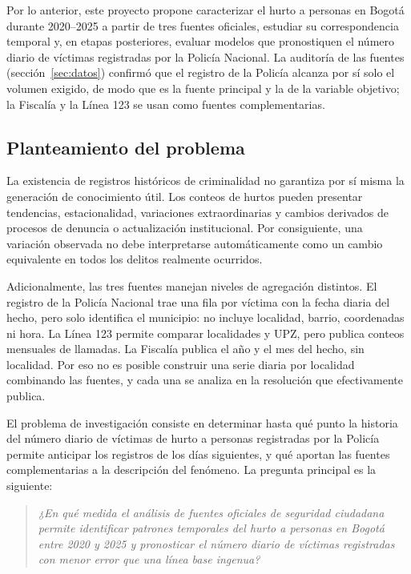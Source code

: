 Por lo anterior, este proyecto propone caracterizar el hurto a personas en Bogotá durante 2020--2025 a partir de tres fuentes oficiales, estudiar su correspondencia temporal y, en etapas posteriores, evaluar modelos que pronostiquen el número diario de víctimas registradas por la Policía Nacional. La auditoría de las fuentes (sección~\ref{sec:datos}) confirmó que el registro de la Policía alcanza por sí solo el volumen exigido, de modo que es la fuente principal y la de la variable objetivo; la Fiscalía y la Línea 123 se usan como fuentes complementarias.

\subsection{Planteamiento del problema}

La existencia de registros históricos de criminalidad no garantiza por sí misma la generación de conocimiento útil. Los conteos de hurtos pueden presentar tendencias, estacionalidad, variaciones extraordinarias y cambios derivados de procesos de denuncia o actualización institucional. Por consiguiente, una variación observada no debe interpretarse automáticamente como un cambio equivalente en todos los delitos realmente ocurridos.

Adicionalmente, las tres fuentes manejan niveles de agregación distintos. El registro de la Policía Nacional trae una fila por víctima con la fecha diaria del hecho, pero solo identifica el municipio: no incluye localidad, barrio, coordenadas ni hora. La Línea 123 permite comparar localidades y UPZ, pero publica conteos mensuales de llamadas. La Fiscalía publica el año y el mes del hecho, sin localidad. Por eso no es posible construir una serie diaria por localidad combinando las fuentes, y cada una se analiza en la resolución que efectivamente publica.

El problema de investigación consiste en determinar hasta qué punto la historia del número diario de víctimas de hurto a personas registradas por la Policía permite anticipar los registros de los días siguientes, y qué aportan las fuentes complementarias a la descripción del fenómeno. La pregunta principal es la siguiente:

\begin{quote}
\emph{¿En qué medida el análisis de fuentes oficiales de seguridad ciudadana permite identificar patrones temporales del hurto a personas en Bogotá entre 2020 y 2025 y pronosticar el número diario de víctimas registradas con menor error que una línea base ingenua?}
\end{quote}

